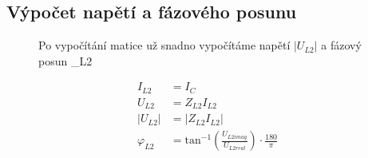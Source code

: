 \subsection{Výpočet napětí a fázového posunu}
\begin{figure}[H]
  Po vypočítání matice už snadno vypočítáme napětí $|U_{L2}|$ a fázový posun \varphi_{L2}

  \begin{equation*}
    \begin{aligned}
      I_{L2}       & = I_C                                                                               \\
      U_{L2}       & = Z_{L2} I_{L2}                                                                     \\
      |U_{L2}|     & = |Z_{L2} I_{L2}|                                                                   \\
      \varphi_{L2} & = \mathrm{tan^{-1}}\left(\frac{U_{L2imag}}{U_{L2real}}\right) \cdot \frac{180}{\pi}
    \end{aligned}
  \end{equation*}
\end{figure}

